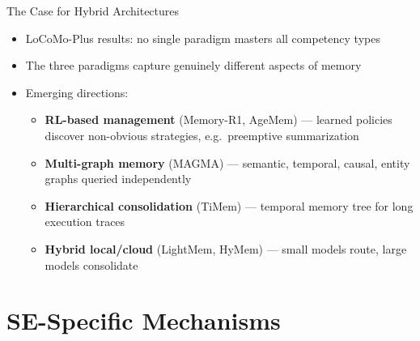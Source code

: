 \documentclass[aspectratio=169]{beamer}
\begin{document}
\begin{frame}{The Case for Hybrid Architectures}
  \begin{itemize}
    \item LoCoMo-Plus results: \alert{no single paradigm masters all competency types}
    \item The three paradigms capture genuinely different aspects of memory
    \item Emerging directions:
    \begin{itemize}
      \item \textbf{RL-based management} (Memory-R1, AgeMem) --- learned policies discover
        non-obvious strategies, e.g.\ preemptive summarization
      \item \textbf{Multi-graph memory} (MAGMA) --- semantic, temporal, causal, entity
        graphs queried independently
      \item \textbf{Hierarchical consolidation} (TiMem) --- temporal memory tree
        for long execution traces
      \item \textbf{Hybrid local/cloud} (LightMem, HyMem) --- small models route,
        large models consolidate
    \end{itemize}
  \end{itemize}
\end{frame}

\section{SE-Specific Mechanisms}

\begin{frame}[plain]
  \sectionpage
\end{frame}
\end{document}
